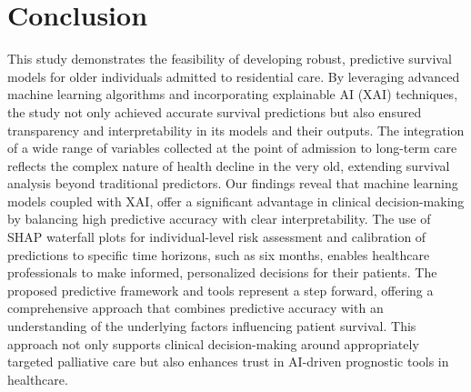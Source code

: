 \documentclass{article}
\begin{document}
\section{Conclusion}

This study demonstrates the feasibility of developing robust, predictive survival models for older individuals admitted to residential care. By leveraging advanced machine learning algorithms and incorporating explainable AI (XAI) techniques, the study not only achieved accurate survival predictions but also ensured transparency and interpretability in its models and their outputs. The integration of a wide range of variables collected at the point of admission to long-term care reflects the complex nature of health decline in the very old, extending survival analysis beyond traditional predictors. Our findings reveal that machine learning models coupled with XAI, offer a significant advantage in clinical decision-making by balancing high predictive accuracy with clear interpretability. The use of SHAP waterfall plots for individual-level risk assessment and calibration of predictions to specific time horizons, such as six months, enables healthcare professionals to make informed, personalized decisions for their patients. The proposed predictive framework and tools represent a step forward, offering a comprehensive approach that combines predictive accuracy with an understanding of the underlying factors influencing patient survival. This approach not only supports clinical decision-making around appropriately targeted palliative care but also enhances trust in AI-driven prognostic tools in healthcare.




\end{document}
